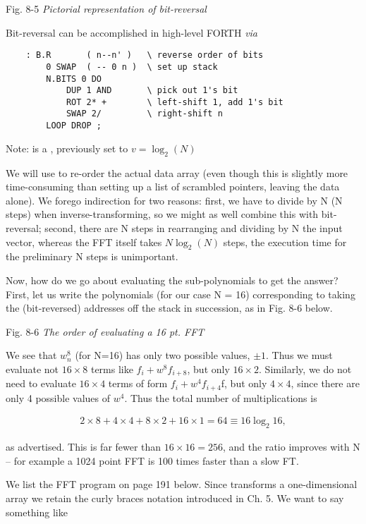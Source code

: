 Fig. 8-5 \textit{Pictorial representation of bit-reversal}

Bit-reversal can be accomplished in high-level FORTH \textit{via}

\begin{lstlisting}
    : B.R       ( n--n' )   \ reverse order of bits
        0 SWAP  ( -- 0 n )  \ set up stack
        N.BITS 0 DO
            DUP 1 AND       \ pick out 1's bit
            ROT 2* +        \ left-shift 1, add 1's bit
            SWAP 2/         \ right-shift n
        LOOP DROP ;
\end{lstlisting}

\leftbar[1\linewidth]
Note:  is a , previously set to $v = \log_{2}(N)$
\endleftbar

We will use  to re-order the actual data array (even though this is slightly more time-consuming than setting up a list of scrambled pointers, leaving the data alone). We forego indirection for two reasons: first, we have to divide by N (N steps) when inverse-transforming, so we might as well combine this with bit-reversal; second, there are N steps in rearranging and dividing by N the input vector, whereas the FFT itself takes $N\log_{2}(N)$ steps, \ie the execution time for the preliminary N steps is unimportant.

Now, how do we go about evaluating the sub-polynomials to get the answer? First, let us write the polynomials (for our case N = 16) corresponding to taking the (bit-reversed) addresses off the stack in succession, as in Fig. 8-6 below.

Fig. 8-6 \textit{The order of evaluating a 16 pt. FFT}

We see that $w_{n}^{8}$ (for N=16) has only two possible values, $\pm1$. Thus we must evaluate not $16\times8$ terms like $f_{i} + w^{8}f_{i+8}$, but only $16\times2$. Similarly, we do not need to evaluate $16\times4$ terms of form $f_{i} + w^{4}f_{i+4}$f, but only $4\times4$, since there are only 4 possible values of $w^{4}$. Thus the total number of multiplications is

\begin{align*}
    2\times8 + 4\times4 + 8\times2 + 16\times1 = 64 \equiv 16\log_{2}16,
\end{align*}

as advertised. This is far fewer than $16\times16=256$, and the ratio improves with N -- for example a 1024 point FFT is 100 times faster than a slow FT.

We list the FFT program on page 191 below. Since  transforms a one-dimensional array we retain the curly braces notation introduced in Ch. 5. We want to say something like

